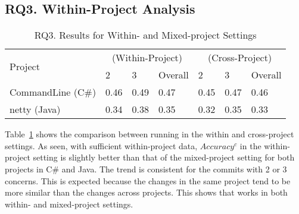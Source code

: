 \subsection{RQ3. Within-Project Analysis}

\begin{table}[t]
	\caption{RQ3. Results for Within- and Mixed-project Settings}
	\vspace{-0.1in}
	\begin{center}
		\footnotesize
		\tabcolsep 4pt
		\renewcommand{\arraystretch}{1} \begin{tabular}{p{2cm}<{\centering}|p{0.8cm}<{\centering}p{0.8cm}<{\centering}p{0.8cm}<{\centering}|p{0.8cm}<{\centering}p{0.8cm}<{\centering}p{0.8cm}<{\centering}}
			
			\hline
			\multirow{2}{*}{Project}     & \multicolumn{3}{c|}{\tool (Within-Project)} & \multicolumn{3}{c}{\tool (Cross-Project)}\\
			\cline{2-7}
			                               &        2       &      3         & Overall  &      2       &        3     & Overall    \\
			
			\hline
			CommandLine (C\#)   &  0.46  & 0.49  &     0.47          &	0.45   & 0.47 &	0.46	       \\
                        netty (Java)   &  0.34  & 0.38  &     0.35          &	0.32   & 0.35 &	0.33	       \\

			\hline
		\end{tabular}
		\label{RQ3-result}
		
	\end{center}
\end{table}


Table~\ref{RQ3-result} shows the comparison between running {\tool} in
the within and cross-project settings. As seen, with sufficient
within-project data, $Accuracy^{c}$ in the within-project setting is
slightly better than that of the mixed-project setting for both
projects in C\# and Java. The trend is consistent for the commits with
2 or 3 concerns. This is expected because the changes in the same
project tend to be more similar than the changes across projects.
This shows that {\tool} works in both within- and mixed-project
settings.

